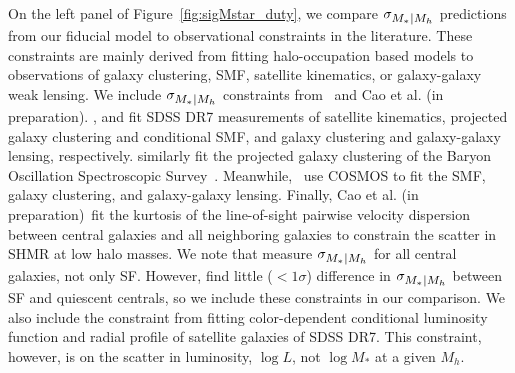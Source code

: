 \documentclass[12pt, letterpaper, preprint, tighten]{aastex62}
\newcommand{\cao}{Cao et al. (in preparation)}
\newcommand{\siglogm}{\sigma_{\scaleto{M_*|M_h}{8pt}}}
\begin{document}
On the left panel of Figure~\ref{fig:sigMstar_duty}, we compare $\siglogm$
predictions from our fiducial model to observational constraints in the 
literature. These constraints are mainly derived from fitting halo-occupation 
based models to observations of galaxy clustering, SMF, satellite kinematics, 
or galaxy-galaxy weak lensing. We include $\siglogm$ constraints 
from~\cite{leauthaud2012, reddick2013, zu2015, tinker2017} and \cao. 
\cite{reddick2013}, and \cite{zu2015} fit SDSS DR7 measurements of satellite 
kinematics, projected galaxy clustering and conditional SMF, and galaxy 
clustering and galaxy-galaxy lensing, respectively. \cite{tinker2017} 
similarly fit the projected galaxy clustering of the Baryon Oscillation 
Spectroscopic Survey~\citep{dawson2013}. Meanwhile,~\cite{leauthaud2012}
use COSMOS to fit the SMF, galaxy clustering, and galaxy-galaxy lensing.
Finally, \cao~fit the kurtosis of the line-of-sight pairwise velocity 
dispersion between central galaxies and all neighboring galaxies to constrain 
the scatter in SHMR at low halo masses. We note that
\cite{leauthaud2012, reddick2013, zu2015, tinker2017} measure $\siglogm$ for all central 
galaxies, not only SF. However, \cite{tinker2013} find little ($< 1\sigma$) difference 
in $\siglogm$ between SF and quiescent centrals, so we include these constraints 
in our comparison. We also include the \cite{lange2018a} constraint from fitting 
color-dependent conditional luminosity function and radial profile of satellite 
galaxies of SDSS DR7. This constraint, however, is on the scatter in luminosity, 
$\log L$, not $\log M_*$ at a given $M_h$.
\end{document}
